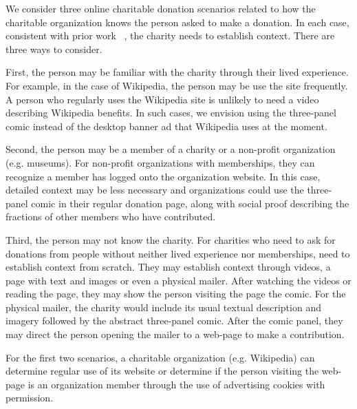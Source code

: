 \begin{description} [leftmargin=\parindent,topsep=0pt,partopsep=3pt,parsep=0pt,itemsep=3pt, listparindent=\parindent]
    \item[Experiment Flow in the Real World:] We consider three online charitable donation scenarios related to how the charitable organization knows the person asked to make a donation. In each case, consistent with prior work ~\cite{pessemier1977willingness}, the charity needs to establish context. There are three ways to consider.
    
    First, the person may be familiar with the charity through their lived experience. For example, in the case of Wikipedia, the person may be use the site frequently. A person who regularly uses the Wikipedia site is unlikely to need a video describing Wikipedia benefits. In such cases, we envision using the three-panel comic instead of the desktop banner ad that Wikipedia uses at the moment.
    
    Second, the person may be a member of a charity or a non-profit organization (e.g. museums). For non-profit organizations with memberships, they can recognize a member has logged onto the organization website. In this case, detailed context may be less necessary and organizations could use the three-panel comic in their regular donation page, along with social proof describing the fractions of other members who have contributed.
    
    Third, the person may not know the charity. For charities who need to ask for donations from people without neither lived experience nor memberships, need to establish context from scratch. They may establish context through videos, a page with text and images or even a physical mailer. After watching the videos or reading the page, they may show the person visiting the page the comic. For the physical mailer, the charity would include its usual textual description and imagery followed by the abstract three-panel comic. After the comic panel, they may direct the person opening the mailer to a web-page to make a contribution.
    
    For the first two scenarios, a charitable organization (e.g. Wikipedia) can determine regular use of its website or determine if the person visiting the web-page is an organization member through the use of advertising cookies with permission.


    
    

\end{description}
